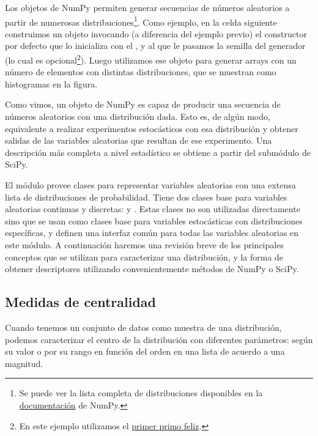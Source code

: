 Los objetos  de NumPy permiten generar secuencias de números aleatorios a partir de numerosas distribuciones\footnote{Se puede ver la lista completa de distribuciones disponibles en la \href{https://numpy.org/doc/stable/reference/random/generator.html\#distributions}{documentación} de NumPy.}. Como ejemplo, en la celda siguiente construimos un objeto  invocando (a diferencia del ejemplo previo) el constructor por defecto  que lo inicializa con el  , y al que le pasamos la semilla del generador (lo cual es opcional\footnote{En este ejemplo utilizamos el \href{https://es.wikipedia.org/wiki/Número\_feliz}{primer primo feliz}.}). Luego utilizamos ese objeto para generar arrays con un número  de elementos con distintas distribuciones, que se muestran como histogramas en la figura.


Como vimos, un objeto  de NumPy es capaz de producir una secuencia de números aleatorios con una distribución dada. Esto es, de algún modo, equivalente a realizar experimentos estocásticos con esa distribución y obtener salidas de las variables aleatorias que resultan de ese experimento. Una descripción más completa a nivel estadístico se obtiene a partir del submódulo  de SciPy.

El módulo  provee clases para representar variables aleatorias con una extensa lista de distribuciones de probabilidad. Tiene dos clases base para variables aleatorias continuas y discretas:  y . Estas clases no son utilizadas directamente sino que se usan como clases base para variables estocásticas con distribuciones específicas, y definen una interfaz común para todas las variables aleatorias en este módulo. A continuación haremos una revisión breve de los principales conceptos que se utilizan para caracterizar una distribución, y la forma de obtener descriptores utilizando convenientemente métodos de NumPy o SciPy.

\subsection{Medidas de centralidad}

Cuando tenemos un conjunto de datos como muestra de una distribución, podemos caracterizar el centro de la distribución con diferentes parámetros: según su valor o por su rango en función del orden en una lista de acuerdo a una magnitud.

